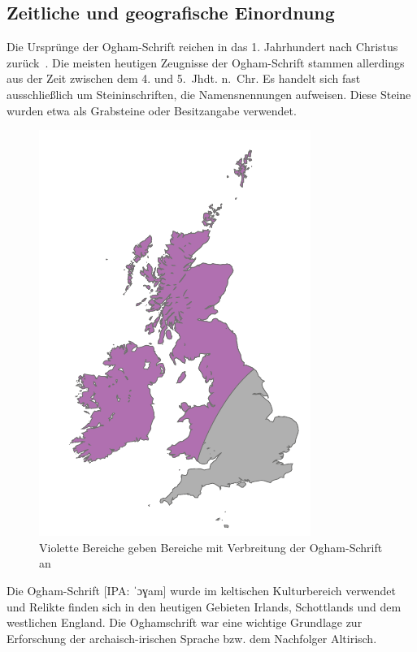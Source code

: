 \documentclass[a4paper]{scrartcl}
\begin{document}
\subsection{Zeitliche und geografische Einordnung}
%
Die Ursprünge der Ogham-Schrift reichen in das 1. Jahrhundert nach Christus zurück~\cite{ogham-heidnisch1}.
Die meisten heutigen Zeugnisse der Ogham-Schrift stammen allerdings aus der Zeit zwischen dem 4. und 5.~Jhdt. n.~Chr.
Es handelt sich fast ausschließlich um Steininschriften, die Namensnennungen aufweisen. Diese Steine wurden etwa als Grabsteine oder Besitzangabe verwendet.

\begin{figure}[t]
  \begin{center}
    \includegraphics{images/ogham_areas.pdf}
    \caption{Violette Bereiche geben Bereiche mit Verbreitung der Ogham-Schrift an}
  \end{center}
\end{figure}

Die Ogham-Schrift [{\footnotesize IPA:} {\ipafont ˈɔɣam}] wurde im keltischen Kulturbereich verwendet und Relikte finden sich in den heutigen Gebieten Irlands, Schottlands und dem westlichen England. Die Oghamschrift war eine wichtige Grundlage zur Erforschung der archaisch-irischen Sprache bzw. dem Nachfolger Altirisch.
\end{document}
